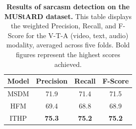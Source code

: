 \begin{table}[ht]

\setlength\tabcolsep{12.06 pt}
\setlength{\abovecaptionskip}{0.2 cm}
\setlength{\belowcaptionskip}{-.36 cm} 
\renewcommand{\arraystretch}{1.36}
\centering
\begin{tabular}{cccc}
    \toprule\toprule
    \textbf{Model} & \textbf{Precision} & \textbf{Recall} & \textbf{F-Score} \\ 
    \midrule
    MSDM    & 71.9 & 71.4 & 71.5 \\
    HFM     & 69.4 & 68.8 & 68.9 \\
    ITHP    & \textbf{75.3} & \textbf{75.2} & \textbf{75.2} \\
    \bottomrule\bottomrule
\end{tabular}
\caption{\textbf{Results of sarcasm detection on the MUStARD dataset.} This table displays the weighted Precision, Recall, and F-Score for the V-T-A (video, text, audio) modality, averaged across five folds. Bold figures represent the highest scores achieved.}
\label{tab:sarcasm_addition}
\end{table}
